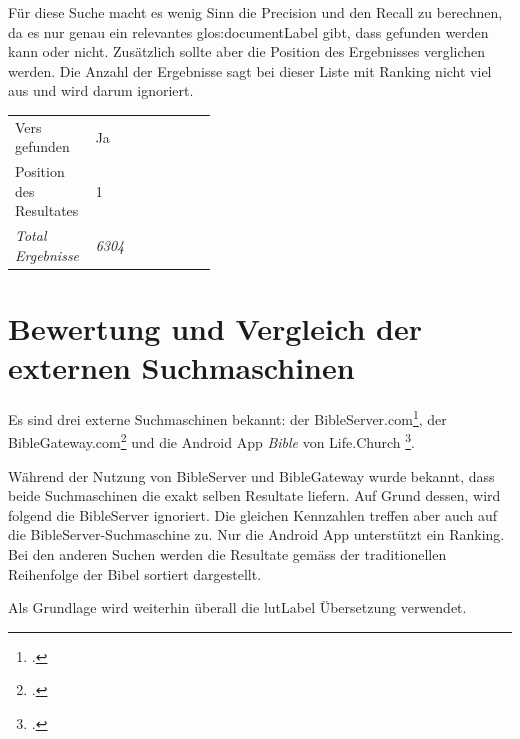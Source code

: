 Für diese Suche macht es wenig Sinn die Precision und den Recall zu berechnen, da es nur genau ein relevantes \gls{glos:documentLabel} gibt, dass gefunden werden kann oder nicht.
Zusätzlich sollte aber die Position des Ergebnisses verglichen werden.
Die Anzahl der Ergebnisse sagt bei dieser Liste mit Ranking nicht viel aus und wird darum ignoriert.

\begin{table}[H]
	\centering
	\small\renewcommand{\arraystretch}{1.4}
	\begin{tabularx}{0.6\textwidth}{ L{0.4\linewidth} | X }%
		\hline
		Vers gefunden & Ja\\
		Position des Resultates & 1\\
		\textit{Total Ergebnisse} & \textit{6304}\\
		\hline
	\end{tabularx}
\end{table}



\newpage
\section{Bewertung und Vergleich der externen Suchmaschinen}
Es sind drei externe Suchmaschinen bekannt: der BibleServer.com\footcite{BibleServer_Die_Bibel_fr_alle_2016-05-30}, der BibleGateway.com\footcite{BibleGateway_2016-05-30} und die Android App \textit{Bible} von Life.Church \footcite{Bible_Android_Apps_on_Google_Play_2016-05-30}.

Während der Nutzung von BibleServer und BibleGateway wurde bekannt, dass beide Suchmaschinen die exakt selben Resultate liefern.
Auf Grund dessen, wird folgend die BibleServer ignoriert. Die gleichen Kennzahlen treffen aber auch auf die BibleServer-Suchmaschine zu.
Nur die Android App unterstützt ein Ranking. Bei den anderen Suchen werden die Resultate gemäss der traditionellen Reihenfolge der Bibel sortiert dargestellt.

Als Grundlage wird weiterhin überall die \gls{lutLabel} Übersetzung verwendet.



